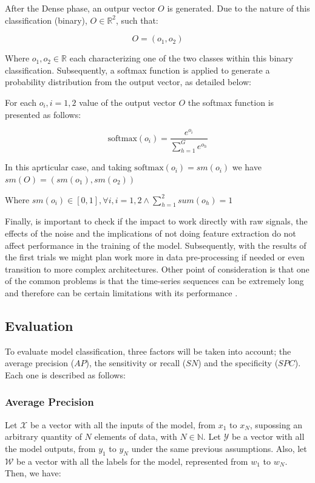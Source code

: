 \documentclass{article}
\begin{document}
After the Dense phase, an outpur vector $O$ is generated. Due to the nature of this classification (binary), $O \in \mathds{R}^2$, such that:

\begin{equation*}
  O = (o_1, o_2)
\end{equation*}

Where $o_1, o_2 \in \mathds{R}$ each characterizing one of the two classes within this binary classification. Subsequently, a softmax function is applied to generate a probability distribution from the output vector, as detailed below:

For each $o_i, i = 1,2$ value of the output vector $O$ the softmax function is presented as follows:

\begin{equation*}
  \text{softmax}(o_i) = \frac{e^{o_i}}{\sum_{h=1}^G e^{o_h}}
\end{equation*}

In this aprticular case, and taking $\text{softmax}(o_i) = sm(o_i)$ we have $sm(O) = (sm(o_1), sm(o_2))$

Where $sm(o_i) \in [0,1], \forall i, i =1,2 \wedge \sum_{h=1}^2 sum(o_h) = 1$

Finally, is important to check if the impact to work directly with raw signals, the effects of the noise and the implications of not doing feature extraction do not affect performance in the training of the model. Subsequently, with the results of the first trials we might plan work more in data pre-processing if needed or even transition to more complex architectures. Other point of consideration is that one of the common problems is that the time-series sequences can be extremely long and therefore can be certain limitations with its performance \cite{Aggarwal2018}.

\subsection{Evaluation}

To evaluate model classification, three factors will be taken into account; the average precision ($AP$), the sensitivity or recall ($SN$) and the specificity ($SPC$). Each one is described as follows:

\subsubsection{Average Precision}

Let $\mathcal{X}$ be a vector with all the inputs of the model, from $x_1$ to $x_N$, supossing an arbitrary quantity of $N$ elements of data, with $N \in \mathds{N}$. Let $\mathcal{Y}$ be a vector with all the model outputs, from $y_1$ to $y_N$ under the same previous assumptions. Also, let $\mathcal{W}$ be a vector with all the labels for the model, represented from $w_1$ to $w_N$. Then, we have:
\end{document}
